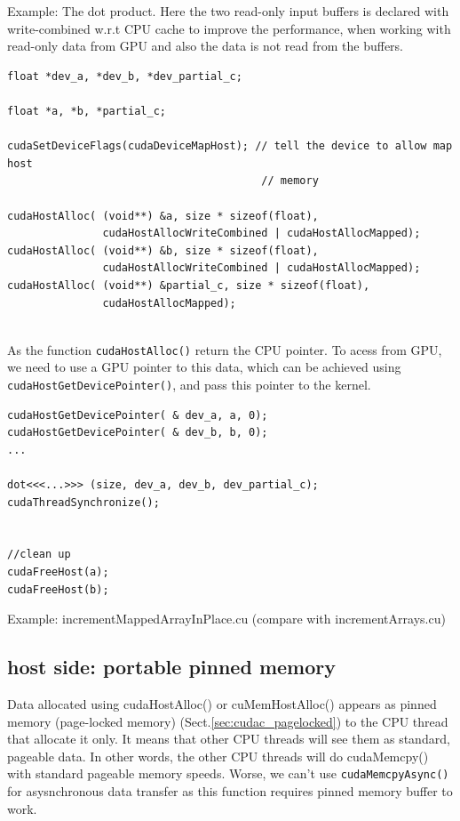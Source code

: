 Example: The dot product. Here the two read-only input buffers is declared with
write-combined w.r.t CPU cache to improve the performance, when working with
read-only data from GPU and also the data is not read from the buffers.
\begin{lstlisting}
float *dev_a, *dev_b, *dev_partial_c;

float *a, *b, *partial_c;

cudaSetDeviceFlags(cudaDeviceMapHost); // tell the device to allow map host
                                        // memory

cudaHostAlloc( (void**) &a, size * sizeof(float),
               cudaHostAllocWriteCombined | cudaHostAllocMapped);
cudaHostAlloc( (void**) &b, size * sizeof(float),
               cudaHostAllocWriteCombined | cudaHostAllocMapped);
cudaHostAlloc( (void**) &partial_c, size * sizeof(float),
               cudaHostAllocMapped);
               
\end{lstlisting}

As the function \verb!cudaHostAlloc()! return the CPU pointer. To acess from
GPU, we need to use a GPU pointer to this data, which can be achieved using
\verb!cudaHostGetDevicePointer()!, and pass this pointer to the kernel.
\begin{lstlisting}
cudaHostGetDevicePointer( & dev_a, a, 0);
cudaHostGetDevicePointer( & dev_b, b, 0);
...

dot<<<...>>> (size, dev_a, dev_b, dev_partial_c);
cudaThreadSynchronize();


//clean up
cudaFreeHost(a);
cudaFreeHost(b);
\end{lstlisting}

Example: incrementMappedArrayInPlace.cu (compare with incrementArrays.cu)

\subsection{host side: portable pinned memory}
\label{sec:cudac_portable_pinned_mem}

Data allocated using cudaHostAlloc() or cuMemHostAlloc() appears as
pinned memory (page-locked memory) (Sect.\ref{sec:cudac_pagelocked}) to
the CPU thread that allocate it only. It means that other CPU threads will see
them as standard, pageable data. In other words, the other CPU threads will do
cudaMemcpy() with standard pageable memory speeds. Worse, we can't use 
\verb!cudaMemcpyAsync()! for asysnchronous data transfer as this function
requires pinned memory buffer to work.

